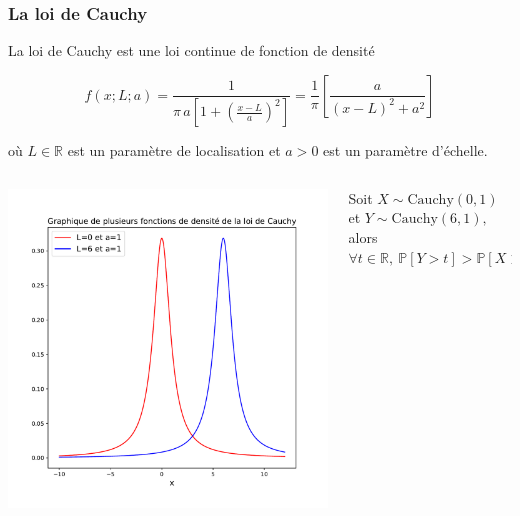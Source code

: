 \documentclass[8pt,sans,aspectratio=169]{beamer}
\begin{document}
\begin{frame}
\frametitle{La loi de Cauchy}
La loi de Cauchy est une loi continue de fonction de densité 

$$f(x;L;a)=\frac{1}{\pi\,a\left[1+\left(\frac{x-L}{a}\right)^2\right]}=\frac{1}{\pi}\left[\frac{a}{(x-L)^2+a^2}\right]$$

où $L\in\mathbb{R}$ est un paramètre de localisation et $a>0$ est un paramètre d'échelle.

\pause
\vspace*{-0.5cm}

\begin{columns}[T]

\begin{column}{0.5\linewidth}

\begin{center}
\includegraphics[scale=0.3]{graphiques_Cauchy-2.pdf}
\end{center}

\end{column}

\pause

\begin{column}{0.5\linewidth}

\vspace*{3cm}

Soit $X\sim\mathrm{Cauchy}(0,1)$ et $Y\sim\mathrm{Cauchy}(6,1),$ alors $\forall t\in\mathbb{R},~\mathbb{P}[Y>t]>\mathbb{P}[X>t]$

\end{column}

\end{columns}

\end{frame}
\end{document}
